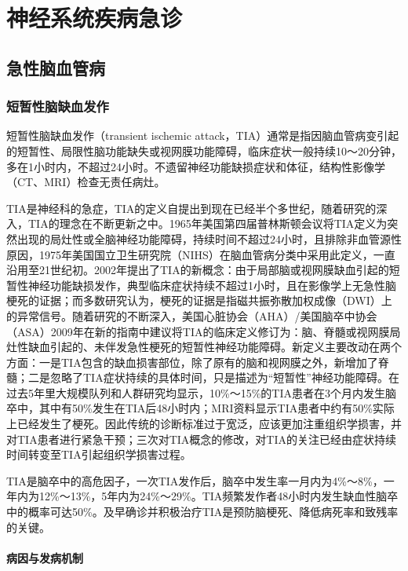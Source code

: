 \part{神经系统疾病急诊}

\chapter{急性脑血管病}

\section{短暂性脑缺血发作}

短暂性脑缺血发作（transient ischemic
attack，TIA）通常是指因脑血管病变引起的短暂性、局限性脑功能缺失或视网膜功能障碍，临床症状一般持续10～20分钟，多在1小时内，不超过24小时。不遗留神经功能缺损症状和体征，结构性影像学（CT、MRI）检查无责任病灶。

TIA是神经科的急症，TIA的定义自提出到现在已经半个多世纪，随着研究的深入，TIA的理念在不断更新之中。1965年美国第四届普林斯顿会议将TIA定义为突然出现的局灶性或全脑神经功能障碍，持续时间不超过24小时，且排除非血管源性原因，1975年美国国立卫生研究院（NIHS）在脑血管病分类中采用此定义，一直沿用至21世纪初。2002年提出了TIA的新概念：由于局部脑或视网膜缺血引起的短暂性神经功能缺损发作，典型临床症状持续不超过1小时，且在影像学上无急性脑梗死的证据；而多数研究认为，梗死的证据是指磁共振弥散加权成像（DWI）上的异常信号。随着研究的不断深入，美国心脏协会（AHA）/美国脑卒中协会（ASA）2009年在新的指南中建议将TIA的临床定义修订为：脑、脊髓或视网膜局灶性缺血引起的、未伴发急性梗死的短暂性神经功能障碍。新定义主要改动在两个方面：一是TIA包含的缺血损害部位，除了原有的脑和视网膜之外，新增加了脊髓；二是忽略了TIA症状持续的具体时间，只是描述为“短暂性”神经功能障碍。在过去5年里大规模队列和人群研究均显示，10\%～15\%的TIA患者在3个月内发生脑卒中，其中有50\%发生在TIA后48小时内；MRI资料显示TIA患者中约有50\%实际上已经发生了梗死。因此传统的诊断标准过于宽泛，应该更加注重组织学损害，并对TIA患者进行紧急干预；三次对TIA概念的修改，对TIA的关注已经由症状持续时间转变至TIA引起组织学损害过程。

TIA是脑卒中的高危因子，一次TIA发作后，脑卒中发生率一月内为4\%～8\%，一年内为12\%～13\%，5年内为24\%～29\%。TIA频繁发作者48小时内发生缺血性脑卒中的概率可达50\%。及早确诊并积极治疗TIA是预防脑梗死、降低病死率和致残率的关键。

\subsection{病因与发病机制}

